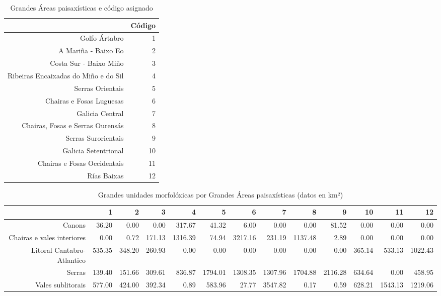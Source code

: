 \begin{table}[p]
\centering
\caption{Grandes Áreas paisaxísticas e código asignado} 
\label{xtaboa0}
\begin{tabular}{rr}
  \hline
 & Código \\ 
  \hline
Golfo Ártabro &   1 \\ 
  A Mariña - Baixo Eo &   2 \\ 
  Costa Sur - Baixo Miño &   3 \\ 
  Ribeiras Encaixadas do Miño e do Sil &   4 \\ 
  Serras Orientais &   5 \\ 
  Chairas e Fosas Luguesas &   6 \\ 
  Galicia Central &   7 \\ 
  Chairas, Fosas e Serras Ourensás &   8 \\ 
  Serras Surorientais &   9 \\ 
  Galicia Setentrional &  10 \\ 
  Chairas e Fosas Occidentais &  11 \\ 
  Rías Baixas &  12 \\ 
   \hline
\end{tabular}
\end{table}
\begin{table}[p]
\centering
\caption{Grandes unidades morfolóxicas por Grandes Áreas paisaxísticas (datos en km²)} 
\label{xtaboa1}
\begin{tabular}{rrrrrrrrrrrrr}
  \hline
 & 1 & 2 & 3 & 4 & 5 & 6 & 7 & 8 & 9 & 10 & 11 & 12 \\ 
  \hline
Canons & 36.20 & 0.00 & 0.00 & 317.67 & 41.32 & 6.00 & 0.00 & 0.00 & 81.52 & 0.00 & 0.00 & 0.00 \\ 
  Chairas e vales interiores & 0.00 & 0.72 & 171.13 & 1316.39 & 74.94 & 3217.16 & 231.19 & 1137.48 & 2.89 & 0.00 & 0.00 & 0.00 \\ 
  Litoral Cantabro-Atlantico & 535.35 & 348.20 & 260.93 & 0.00 & 0.00 & 0.00 & 0.00 & 0.00 & 0.00 & 365.14 & 533.13 & 1022.43 \\ 
  Serras & 139.40 & 151.66 & 309.61 & 836.87 & 1794.01 & 1308.35 & 1307.96 & 1704.88 & 2116.28 & 634.64 & 0.00 & 458.95 \\ 
  Vales sublitorais & 577.00 & 424.00 & 392.34 & 0.89 & 583.96 & 27.77 & 3547.82 & 0.17 & 0.59 & 628.21 & 1543.13 & 1219.06 \\ 
   \hline
\end{tabular}
\end{table}
